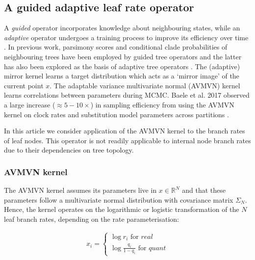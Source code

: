 \documentclass[10pt,letterpaper]{article}
\begin{document}
\subsection*{A guided adaptive leaf rate operator}


A \textit{guided} operator incorporates knowledge about neighbouring states, while an \textit{adaptive} operator undergoes a training process to improve its efficiency over time \cite{roberts2007coupling}. In previous work, parsimony scores and conditional clade probabilities of neighbouring trees have been employed by guided tree operators \cite{hohna2012guided,zhang2019using,meyer2019adaptive} and the latter has also been explored as the basis of  adaptive tree operators \cite{hohna2012guided,meyer2019adaptive}. The (adaptive) mirror kernel \cite{thawornwattana2018designing} learns a target distribution which acts as a `mirror image' of the current point $x$.  The adaptable variance multivariate normal (AVMVN) kernel \cite{baele2017adaptive,suchard2018bayesian} learns correlations between parameters during MCMC. Baele et al. 2017  observed a large increase ($\approx 5-10 \times$) in sampling efficiency from using the AVMVN kernel on clock rates and substitution model parameters across partitions \cite{baele2017adaptive}.  


In this article we consider application of the AVMVN kernel to the branch rates of leaf nodes. This operator is not readily applicable to internal node branch rates due to their dependencies on tree topology.  




\subsubsection*{AVMVN kernel}
\label{AVMVN_sect}

The AVMVN kernel assumes its parameters live in $x \in \mathbb{R}^N$ and that these parameters follow a multivariate normal distribution with covariance matrix $\Sigma_N$. Hence, the kernel operates on the logarithmic or logistic transformation of the $N$ leaf branch rates, depending on the rate parameterisation:

\begin{align}
	x_i = \begin{cases} \log r_i \text{ for } \textit{real} \\
						\log \frac{q_i}{1 - q_i} \text{ for } \textit{quant}  \end{cases}
\end{align}
\end{document}
